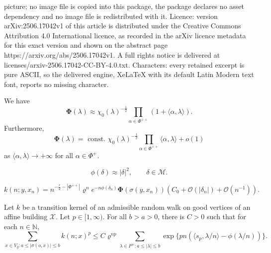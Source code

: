 \documentclass[10pt,a4paper]{amsart}
\newcommand{\NN}{\mathbb{N}}
\newcommand{\calM}{\mathcal{M}}
\newcommand{\norm}[1]{\lvert {#1} \rvert}
\newcommand{\scrX}{\mathscr{X}}
\newcommand{\sprod}[2]{\langle {#1}, {#2} \rangle}
\begin{document}
picture; no image file is copied into this package, the package declares no asset dependency and no image file is redistributed with it. Licence: version arXiv:2506.17042v1 of this article is distributed under the Creative Commons Attribution 4.0 International licence, as recorded in the arXiv licence metadata for this exact version and shown on the abstract page https://arxiv.org/abs/2506.17042v1. A full rights notice is delivered at licenses/arxiv-2506.17042-CC-BY-4.0.txt. Characters: every retained excerpt is pure ASCII, so the delivered engine, XeLaTeX with its default Latin Modern text font, reports no missing character.
\begin{proposition} 
	\label{prop:1}
	We have
	\[
		\mathbf{\Phi}(\lambda)
		\approx \chi_0(\lambda)^{-\frac{1}{2}} \prod_{\alpha \in \Phi^{++}}(1+\langle\alpha, \lambda\rangle).
	\]
	Furthermore,
	\[
		\mathbf{\Phi}(\lambda)
		= \text{ const. } \chi_0(\lambda)^{-\frac{1}{2}}  
		\prod_{\alpha \in \Phi^{++}} \langle\alpha, \lambda\rangle + o(1)
	\]
	as $\langle\alpha, \lambda\rangle \rightarrow +\infty$  for all  $\alpha \in \Phi^{+}.$
\end{proposition}

\begin{equation}
	\label{eq:33b}
	\phi(\delta) \approx \norm{\delta}^2, \qquad \delta \in \calM.
\end{equation}

\begin{equation}
	\label{eq:3b}
	k(n; y, x_n) =
	n^{-\frac{r}{2}-\left|\Phi^{++}\right|} \varrho^n e^{-n \phi\left(\delta_n\right)} 
	\mathbf{\Phi}(\sigma(y, x_n))
	\left(C_0+\mathcal{O}(\left|\delta_n\right|)+\mathcal{O}(n^{-1})\right).
\end{equation}

\begin{lemma}
	\label{lem:4}
	Let $k$ be a transition kernel of an admissible random walk on good vertices of an affine building $\scrX$.
	Let $p \in [1, \infty)$. For all $b > a > 0$, there is $C > 0$ such that for each $n \in \NN$,
	\[
		\sum_{x \in V_g : a\leqslant |\sigma(o,x)|\leqslant b} k(n; x)^p
		\leqslant
		C
		\varrho^{np} \sum_{\lambda \in P^+ : a\leqslant |\lambda|\leqslant b}
		\exp\Big\{p n (\sprod{s_p}{\lambda/n} - \phi(\lambda/n))\Big\}.
	\]
\end{lemma}
\end{document}
